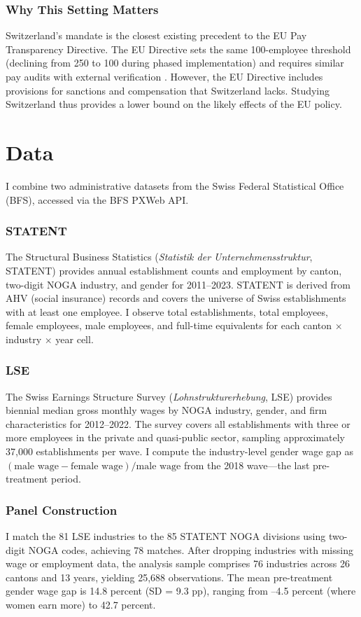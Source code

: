 \documentclass[12pt]{article}
\begin{document}
\subsubsection*{Why This Setting Matters} Switzerland's mandate is the closest existing precedent to the EU Pay Transparency Directive. The EU Directive sets the same 100-employee threshold (declining from 250 to 100 during phased implementation) and requires similar pay audits with external verification \citep{eu2023directive}. However, the EU Directive includes provisions for sanctions and compensation that Switzerland lacks. Studying Switzerland thus provides a lower bound on the likely effects of the EU policy.


\section{Data}

I combine two administrative datasets from the Swiss Federal Statistical Office (BFS), accessed via the BFS PXWeb API.

\subsubsection*{STATENT} The Structural Business Statistics (\textit{Statistik der Unternehmensstruktur}, STATENT) provides annual establishment counts and employment by canton, two-digit NOGA industry, and gender for 2011--2023. STATENT is derived from AHV (social insurance) records and covers the universe of Swiss establishments with at least one employee. I observe total establishments, total employees, female employees, male employees, and full-time equivalents for each canton $\times$ industry $\times$ year cell.

\subsubsection*{LSE} The Swiss Earnings Structure Survey (\textit{Lohnstrukturerhebung}, LSE) provides biennial median gross monthly wages by NOGA industry, gender, and firm characteristics for 2012--2022. The survey covers all establishments with three or more employees in the private and quasi-public sector, sampling approximately 37,000 establishments per wave. I compute the industry-level gender wage gap as $(\text{male wage} - \text{female wage}) / \text{male wage}$ from the 2018 wave---the last pre-treatment period.

\subsubsection*{Panel Construction} I match the 81 LSE industries to the 85 STATENT NOGA divisions using two-digit NOGA codes, achieving 78 matches. After dropping industries with missing wage or employment data, the analysis sample comprises 76 industries across 26 cantons and 13 years, yielding 25,688 observations. The mean pre-treatment gender wage gap is 14.8 percent (SD = 9.3 pp), ranging from --4.5 percent (where women earn more) to 42.7 percent.
\end{document}
